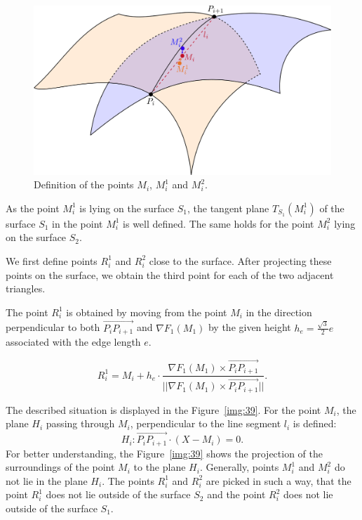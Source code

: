 \begin{figure}[h!]
    \centerline{\includegraphics[scale=0.5]{images/img38}}
    \caption[Definition of the points $M_i$, $M_i^1$ and $M_i^2$]
    {Definition of the points $M_i$, $M_i^1$ and $M_i^2$.}
    \label{img:38}
\end{figure}

As the point $M_i^1$ is lying on the surface $S_1$, the tangent plane $T_{S_1}(M_i^1)$ 
of the surface $S_1$ in the point $M_i^1$ is well defined. The same holds for the 
point $M_i^2$ lying on the surface $S_2$. 

We first define points $R_i^1$ and $R_i^2$ close to the surface. After projecting
these points on the surface, we obtain the third point for each of the two 
adjacent triangles.

The point $R_i^1$ is obtained by moving from the point $M_i$ in the direction 
perpendicular to both $\overrightarrow{P_{i} P_{i+1}}$ and 
$\nabla{F_1}(M_1)$ by the given height $h_e = \frac{\sqrt{3}}{2}e$ associated with 
the edge length $e$.

$$R_i^1 = M_i + h_e \cdot \frac{\nabla{F_1}(M_1) \times \overrightarrow{P_{i} P_{i+1}}}{||\nabla{F_1}(M_1) \times \overrightarrow{P_i P_{i+1}}||}.$$

The described situation is displayed in the Figure~\ref{img:39}.
For the point $M_i$, the plane $H_i$ passing through $M_i$, perpendicular to the
line segment $l_i$ is defined:
$$H_i : \overrightarrow{P_i P_{i+1}} \cdot (X-M_i) = 0.$$
For better understanding, the Figure~\ref{img:39} shows the projection of the surroundings
of the point $M_i$ to the plane $H_i$. Generally, points $M_i^1$ and $M_i^2$ do not lie in
the plane $H_i$. The points $R_i^1$ and $R_i^2$ are picked in such a way, that the point
$R_i^1$ does not lie outside of the surface $S_2$ and the point $R_i^2$ does not lie outside of 
the surface $S_1$.

